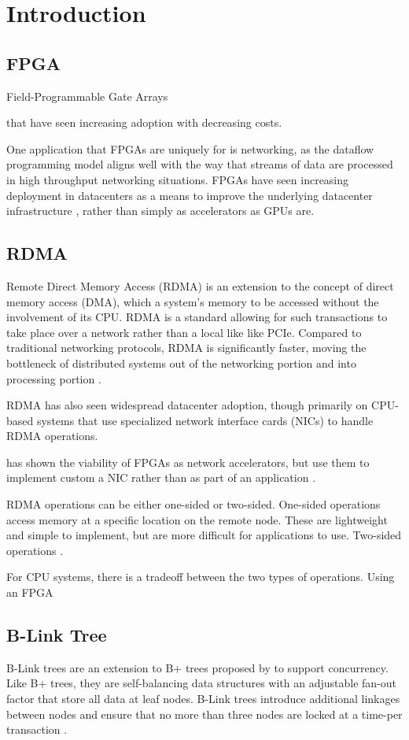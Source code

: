 \section{Introduction}

\subsection{FPGA}

Field-Programmable Gate Arrays

that have seen increasing adoption with decreasing costs.

One application that FPGAs are uniquely for is networking, as the dataflow programming model aligns well with the way that streams of data are processed in high throughput networking situations. FPGAs have seen increasing deployment in datacenters as a means to improve the underlying datacenter infrastructure \cite{bobda-trets-2022}, rather than simply as accelerators as GPUs are.


\subsection{RDMA}

Remote Direct Memory Access (RDMA) is an extension to the concept of direct memory access (DMA), which a system's memory to be accessed without the involvement of its CPU. RDMA is a standard allowing for such transactions to take place over a network rather than a local like like PCIe. Compared to traditional networking protocols, RDMA is significantly faster, moving the bottleneck of distributed systems out of the networking portion and into processing portion \cite{binnig-vldb-2016}.

RDMA has also seen widespread datacenter adoption, though primarily on CPU-based systems that use specialized network interface cards (NICs) to handle RDMA operations.

\citet{star} has shown the viability of FPGAs as network accelerators, but \citeauthor{star} use them to implement custom a NIC rather than as part of an application \cite{star}.

RDMA operations can be either one-sided or two-sided. One-sided operations access memory at a specific location on the remote node. These are lightweight and simple to implement, but are more difficult for applications to use. Two-sided operations  \cite{base}.

For CPU systems, there is a tradeoff between the two types of operations. Using an FPGA


\subsection{B-Link Tree}

B-Link trees are an extension to B+ trees proposed by \citeauthor{b-link} to support concurrency. Like B+ trees, they are self-balancing data structures with an adjustable fan-out factor that store all data at leaf nodes. B-Link trees introduce additional linkages between nodes and ensure that no more than three nodes are locked at a time-per transaction \cite{b-link}.
